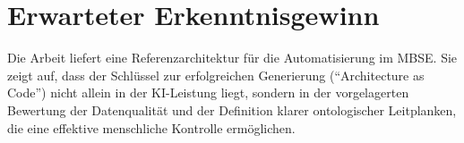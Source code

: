 \documentclass[12pt, a4paper]{article}
\begin{document}
\section{Erwarteter Erkenntnisgewinn}

Die Arbeit liefert eine Referenzarchitektur für die Automatisierung im MBSE. Sie zeigt auf, dass der Schlüssel zur erfolgreichen Generierung (\enquote{Architecture as Code}) nicht allein in der KI-Leistung liegt, sondern in der vorgelagerten Bewertung der Datenqualität und der Definition klarer ontologischer Leitplanken, die eine effektive menschliche Kontrolle ermöglichen.
\end{document}
